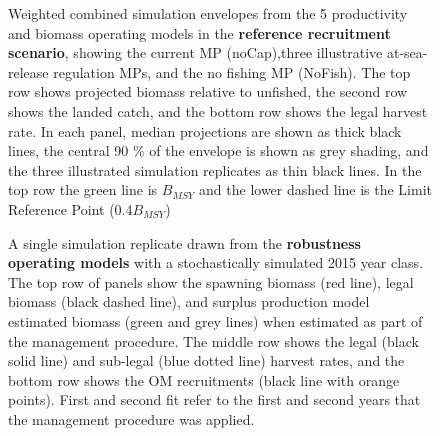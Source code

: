 \documentclass[11pt]{book}
\begin{document}
\begin{landscape}
\begin{figure}[htb]
{}

\caption{Weighted combined simulation envelopes from the 5 productivity and biomass operating models in the \textbf{reference recruitment scenario}, showing the current MP (noCap),three illustrative at-sea-release regulation MPs, and the no fishing MP (NoFish). The top row shows projected biomass relative to unfished, the second row shows the landed catch, and the bottom row shows the legal harvest rate. In each panel, median projections are shown as thick black lines, the central 90 \% of the envelope is shown as grey shading, and the three illustrated simulation replicates as thin black lines. In the top row the green line is $B_{MSY}$ and the lower dashed line is the Limit Reference Point (0.4$B_{MSY}$)}\label{fig:unnamed-chunk-24}
\end{figure}
\newpage
\begin{figure}[htb]

{\centering {} 

}

\caption{A single simulation replicate drawn from the \textbf{robustness operating models} with a stochastically simulated 2015 year class. The top row of panels show the spawning biomass (red line), legal biomass (black dashed line), and surplus production model estimated biomass (green and grey lines) when estimated as part of the management procedure. The middle row shows the legal (black solid line) and sub-legal (blue dotted line) harvest rates, and the bottom row shows the OM recruitments (black line with orange points). First and second fit refer to the first and second years that the management procedure was applied.}\label{fig:unnamed-chunk-25}
\end{figure}
\newpage
\begin{figure}[htb]


\end{figure}
\end{landscape}
\end{document}
